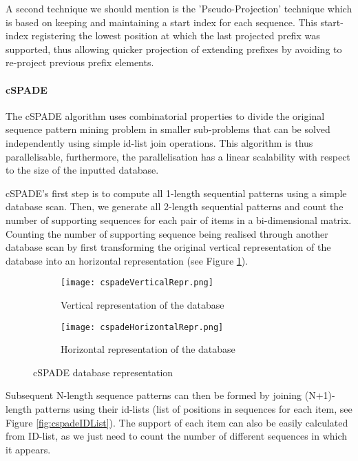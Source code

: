 \documentclass{eplmastersthesis}
\begin{document}
A second technique we should mention is the 'Pseudo-Projection' technique which is based on keeping and maintaining a start index for each sequence. This start-index registering the lowest position at which the last projected prefix was supported, thus allowing quicker projection of extending prefixes by avoiding to re-project previous prefix elements.

\paragraph{cSPADE}

The cSPADE algorithm \cite{zaki2001spade} uses combinatorial properties to divide the original sequence pattern mining problem in smaller sub-problems that can be solved independently using simple id-list join operations. This algorithm is thus parallelisable, furthermore, the parallelisation has a linear scalability with respect to the size of the inputted database. \newline

cSPADE's first step is to compute all 1-length sequential patterns using a simple database scan. Then, we generate all 2-length sequential patterns and count the number of supporting sequences for each pair of items in a bi-dimensional matrix. Counting the number of supporting sequence being realised through another database scan by first transforming the original vertical representation of the database into an horizontal representation (see Figure \ref{ex:cspadeDatabaseRepr}).

\begin{figure}[h]
  \centering
  \begin{subfigure}[t]{0.4\textwidth}
  	\centering
  	\texttt{[image: cspadeVerticalRepr.png]}
    \caption{Vertical representation of the database}
  \end{subfigure}
  \begin{subfigure}[t]{0.59\textwidth}
  	\centering
    \texttt{[image: cspadeHorizontalRepr.png]}
    \caption{Horizontal representation of the database}
  \end{subfigure}
  \caption{cSPADE database representation}
  \label{ex:cspadeDatabaseRepr}
\end{figure}

Subsequent N-length sequence patterns can then be formed by joining (N+1)-length patterns using their id-lists (list of positions in sequences for each item, see Figure \ref{fig:cspadeIDList}). The support of each item can also be easily calculated from ID-list, as we just need to count the number of different sequences in which it appears.  \newline
\end{document}
